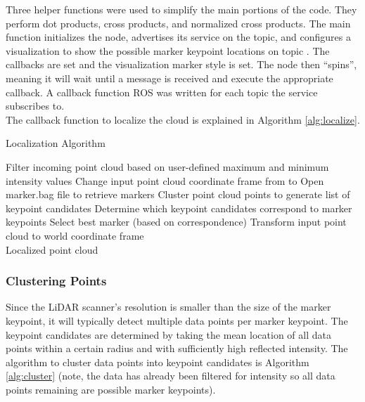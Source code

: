 Three helper functions were used to simplify the main portions of the code. They perform dot products, cross products, and normalized cross products. The main function initializes the node, advertises its service on the  topic, and configures a visualization to show the possible marker keypoint locations on topic . The  callbacks are set and the visualization marker style is set. The node then ``spins'', meaning it will wait until a message is received and execute the appropriate callback. A callback function ROS was written for each topic the service subscribes to.\\

The callback function to localize the cloud is explained in Algorithm \ref{alg:localize}.
\begin{algorithm}[H]
\caption{Localization Algorithm}
\label{alg:localize}
\begin{algorithmic}[1]
\begin{raggedright}
\State Filter incoming point cloud based on user-defined maximum and minimum intensity values
\State Change input point cloud coordinate frame from  to 
\Else
\State Open marker.bag file to retrieve markers
\State Cluster point cloud points to generate list of keypoint candidates
\State Determine which keypoint candidates correspond to marker keypoints
\State Select best marker (based on correspondence)
\State Transform input point cloud to world coordinate frame \EndIf
\EndFunction\\
\Return Localized point cloud
\end{raggedright}
\end{algorithmic}
\end{algorithm}

\subsubsection{Clustering Points}
Since the LiDAR scanner's resolution is smaller than the size of the marker keypoint, it will typically detect multiple data points per marker keypoint. The keypoint candidates are determined by taking the mean location of all data points within a certain radius and with sufficiently high reflected intensity. The algorithm to cluster data points into keypoint candidates is Algorithm \ref{alg:cluster} (note, the data has already been filtered for intensity so all data points remaining are possible marker keypoints).

